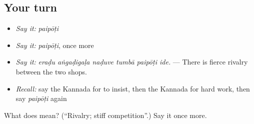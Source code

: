 \subsection*{Your turn}
\begin{itemize}
\raggedright
  \item \emph{Say it:} \emph{paipōṭi}
  \item \emph{Say it:} \emph{paipōṭi}, once more
  \item \emph{Say it:} \emph{eraḍu aṅgaḍigaḷa naḍuve tumbā paipōṭi ide.} — There is fierce rivalry between the two shops.
  \item \emph{Recall:} say the Kannada for to insist, then the Kannada for hard work, then say \emph{paipōṭi} again
\end{itemize}

\begin{tcolorbox}[breakable,colback=teal!4,colframe=teal!35!black,title={Before you move on}]
What does  mean? (\textquotedblleft{}Rivalry; stiff competition\textquotedblright{}.) Say it once more.
\end{tcolorbox}
